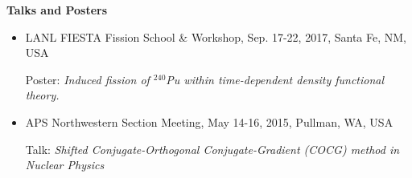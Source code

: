 \documentclass[letterpaper,12pt]{article}
\newcommand{\resheading}[1]{{\large \colorbox{mygrey}{\begin{minipage}{\textwidth}{\textbf{#1 \vphantom{p\^{E}}}}\end{minipage}}}}
\begin{document}
\resheading{Talks and Posters} 
\fontsize{10}{12}\selectfont

\begin{itemize}
\itemsep0em
\item
LANL FIESTA Fission School \& Workshop, Sep. 17-22, 2017,   Santa Fe, NM, USA

Poster: \textit{Induced fission of $^{240}$Pu within time-dependent density functional theory.}

\item
APS Northwestern Section Meeting, May 14-16, 2015,   Pullman, WA, USA

Talk: \textit{Shifted Conjugate-Orthogonal Conjugate-Gradient (COCG) method in Nuclear Physics}


\end{itemize}




     
\end{document}
